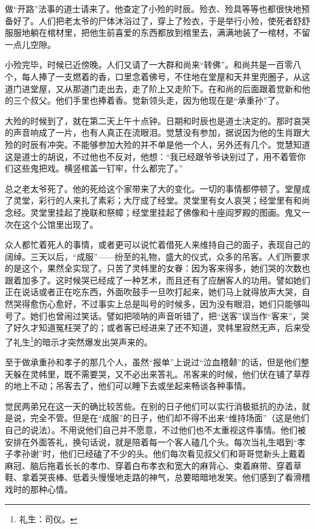 \par 做“开路”法事的道士请来了。他查定了小殓的时辰。殓衣、殓具等等也都很快地预备好了。人们把老太爷的尸体沐浴过了，穿上了殓衣，于是举行小殓，使死者舒舒服服地躺在棺材里，把他生前喜爱的东西都放到棺里去，满满地装了一棺材，不留一点儿空隙。
\par 小殓完毕，时候已近傍晚。人们又请了一大群和尚来“转佛”。和尚共是一百零八个，每人捧了一支燃着的香，口里念着佛号，不住地在堂屋和天井里兜圈子，从这道门进堂屋，又从那道门走出去，走了阶上又走阶下。在和尚的后面跟着觉新和他的三个叔父。他们手里也捧着香。觉新领头走，因为他现在是“承重孙”了。
\par 大殓的时候到了，就在第二天上午十点钟。日期和时辰也是道士决定的。那时哀哭的声音响成了一片，也有人真正在流眼泪。觉慧没有参加，据说因为他的生肖跟大殓的时辰有冲突。不能够参加大殓的并不单是他一个人，另外还有几个。觉慧知道这是道士的胡说，不过他也不反对，他想：“我已经跟爷爷诀别过了，用不着管你们这些鬼把戏。横竖棺盖一钉牢，什么都完了。”
\par 总之老太爷死了。他的死给这个家带来了大的变化。一切的事情都停顿了。堂屋成了灵堂，彩行的人来扎了素彩；大厅成了经堂。灵堂里有女人哀哭；经堂里有和尚念经。灵堂里挂起了挽联和祭幛；经堂里挂起了佛像和十座阎罗殿的图画。鬼又一次在这个公馆里出现了。
\par 众人都忙着死人的事情，或者更可以说忙着借死人来维持自己的面子，表现自己的阔绰。三天以后，“成服”——纷至的礼物，盛大的仪式，众多的吊客。人们所要求的是这个，果然全实现了。只苦了灵帏里的女眷：因为客来得多，她们哭的次数也跟着加多了。这时候哭已经成了一种艺术，而且还有了应酬客人的功用。譬如她们正在说话或者正在吃东西，外面吹鼓手一旦吹打起来，她们马上就得放声大哭，自然哭得愈伤心愈好，不过事实上总是叫号的时候多，因为没有眼泪，她们只能够叫号了。她们也曾闹过笑话。譬如把唢呐的声音听错了，把“送客”误当作“客来”，哭了好久才知道冤枉哭了的；或者客已经进来了还不知道，灵帏里寂然无声，后来受了礼生\footnote{礼生：司仪。}的暗示才突然爆发出哭声来的。
\par 至于做承重孙和孝子的那几个人，虽然“报单”上说过“泣血稽颡”的话，但是他们整天躲在灵帏里，既不需要哭，又不必出来答礼。吊客来的时候，他们伏在铺了草荐的地上不动；吊客去了，他们可以睡下去或坐起来畅谈各种事情。
\par 觉民两弟兄在这一天的确比较苦些。在别的日子他们可以实行消极抵抗的办法，就是说，完全不管。但是在“成服”的日子，他们却不得不出来“维持场面”（这是他们自己的说法）。不用说他们自己并不愿意，不过他们也不太重视这件事情。他们被安排在外面答礼，换句话说，就是陪着每一个客人磕几个头。每次当礼生唱到“孝子孝孙谢”时，他们已经磕了不少的头。他们每次看见叔父们和哥哥觉新头上戴着麻冠、脑后拖着长长的孝巾、穿着白布孝衣和宽大的麻背心、束着麻带、穿着草鞋、拿着哭丧棒、低着头慢慢地走路的神气，总要暗暗地发笑。他们感到了看滑稽戏时的那种心情。
